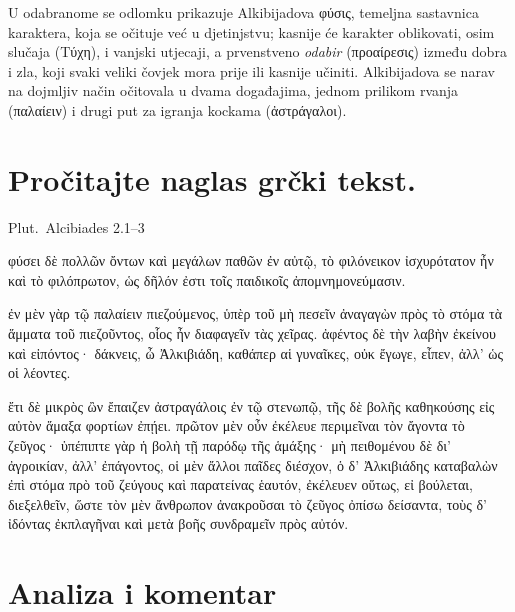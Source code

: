 U odabranome se odlomku prikazuje Alkibijadova \textgreek[variant=ancient]{φύσις,} temeljna sastavnica karaktera, koja se očituje već u djetinjstvu; kasnije će karakter oblikovati, osim slučaja \textgreek[variant=ancient]{(Τύχη),} i vanjski utjecaji, a prvenstveno \textit{odabir} \textgreek[variant=ancient]{(προαίρεσις)} između dobra i zla, koji svaki veliki čovjek mora prije ili kasnije učiniti. Alkibijadova se narav na dojmljiv način očitovala u dvama događajima, jednom prilikom rvanja \textgreek[variant=ancient]{(παλαίειν)} i drugi put za igranja kockama \textgreek[variant=ancient]{(ἀστράγαλοι).}


\section*{Pročitajte naglas grčki tekst.}

Plut.\ Alcibiades 2.1–3


\medskip


{\large

\begin{greek}

\noindent φύσει δὲ πολλῶν ὄντων καὶ μεγάλων παθῶν ἐν αὐτῷ, τὸ φιλόνεικον ἰσχυρότατον ἦν καὶ τὸ φιλόπρωτον, ὡς δῆλόν ἐστι τοῖς παιδικοῖς ἀπομνημονεύμασιν.

ἐν μὲν γὰρ τῷ παλαίειν πιεζούμενος, ὑπὲρ τοῦ μὴ πεσεῖν ἀναγαγὼν πρὸς τὸ στόμα τὰ ἅμματα τοῦ πιεζοῦντος, οἷος ἦν διαφαγεῖν τὰς χεῖρας. ἀφέντος δὲ τὴν λαβὴν ἐκείνου καὶ εἰπόντος· δάκνεις, ὦ Ἀλκιβιάδη, καθάπερ αἱ γυναῖκες, οὐκ ἔγωγε, εἶπεν, ἀλλ' ὡς οἱ λέοντες.

ἔτι δὲ μικρὸς ὢν ἔπαιζεν ἀστραγάλοις ἐν τῷ στενωπῷ, τῆς δὲ βολῆς καθηκούσης εἰς αὐτὸν ἅμαξα φορτίων ἐπῄει. πρῶτον μὲν οὖν ἐκέλευε περιμεῖναι τὸν ἄγοντα τὸ ζεῦγος· ὑπέπιπτε γὰρ ἡ βολὴ τῇ παρόδῳ τῆς ἁμάξης· μὴ πειθομένου δὲ δι' ἀγροικίαν, ἀλλ' ἐπάγοντος, οἱ μὲν ἄλλοι παῖδες διέσχον, ὁ δ' Ἀλκιβιάδης καταβαλὼν ἐπὶ στόμα πρὸ τοῦ ζεύγους καὶ παρατείνας ἑαυτόν, ἐκέλευεν οὕτως, εἰ βούλεται, διεξελθεῖν, ὥστε τὸν μὲν ἄνθρωπον ἀνακροῦσαι τὸ ζεῦγος ὀπίσω δείσαντα, τοὺς δ' ἰδόντας ἐκπλαγῆναι καὶ μετὰ βοῆς συνδραμεῖν πρὸς αὐτόν.

\end{greek}

}


\section*{Analiza i komentar}

